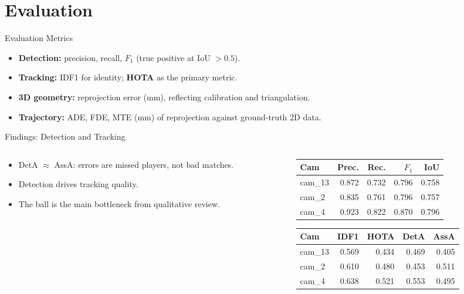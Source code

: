 \section{Evaluation}
\label{sec:evaluation}
\begin{frame}{Evaluation Metrics}
\begin{itemize}
  \item \textbf{Detection:} precision, recall, $F_1$ (true positive at IoU $> 0.5$).
  \item \textbf{Tracking:} IDF1 for identity; \textbf{HOTA} \cite{hota} as the primary metric.
  \item \textbf{3D geometry:} reprojection error (mm), reflecting calibration and triangulation.
  \item \textbf{Trajectory:} ADE, FDE, MTE (mm) of reprojection against ground-truth 2D data.
\end{itemize}
\end{frame}

\begin{frame}{Findings: Detection and Tracking}
\begin{columns}[T]
  \begin{column}{0.52\textwidth}
    \begin{itemize}
      \item DetA $\approx$ AssA: errors are missed players, not bad matches.
      \item Detection drives tracking quality.
      \item The ball is the main bottleneck from qualitative review.
    \end{itemize}
  \end{column}
  \begin{column}{0.46\textwidth}
    \centering
    \scriptsize
    \begin{tabular}{lrrrr}
      \toprule
      Cam & Prec. & Rec. & $F_1$ & IoU \\
      \midrule
      cam\_13 & 0.872 & 0.732 & 0.796 & 0.758 \\
      cam\_2  & 0.835 & 0.761 & 0.796 & 0.757 \\
      cam\_4  & 0.923 & 0.822 & 0.870 & 0.796 \\
      \bottomrule
    \end{tabular}

    \vspace{2em}

    \begin{tabular}{lrrrr}
      \toprule
      Cam & IDF1 & HOTA & DetA & AssA \\
      \midrule
      cam\_13 & 0.569 & 0.434 & 0.469 & 0.405 \\
      cam\_2  & 0.610 & 0.480 & 0.453 & 0.511 \\
      cam\_4  & 0.638 & 0.521 & 0.553 & 0.495 \\
      \bottomrule
    \end{tabular}
  \end{column}
\end{columns}
\end{frame}

